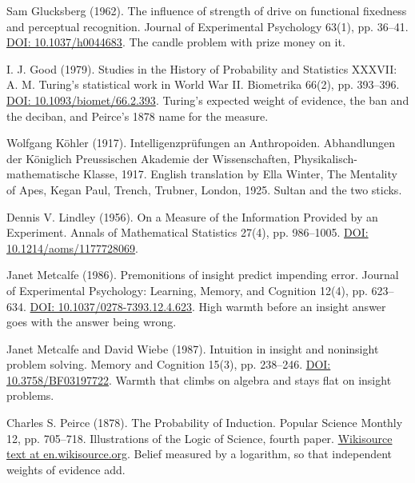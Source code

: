 \documentclass[11pt,twoside]{article}
\theoremstyle{thielethm}
\theoremstyle{thieledef}
\theoremstyle{thieledef}
\theoremstyle{thieledef}
\theoremstyle{thielethm}
\theoremstyle{thieleobs}
\theoremstyle{thielethm}
\begin{document}
\noindent Sam Glucksberg (1962). The influence of strength of drive on functional fixedness and perceptual recognition. Journal of Experimental Psychology 63(1), pp. 36--41. \href{https://doi.org/10.1037/h0044683}{DOI: 10.1037/h0044683}. The candle problem with prize money on it.
\par\medskip

\noindent I. J. Good (1979). Studies in the History of Probability and Statistics XXXVII: A. M. Turing's statistical work in World War II. Biometrika 66(2), pp. 393--396. \href{https://doi.org/10.1093/biomet/66.2.393}{DOI: 10.1093/biomet/66.2.393}. Turing's expected weight of evidence, the ban and the deciban, and Peirce's 1878 name for the measure.
\par\medskip

\noindent Wolfgang K\"ohler (1917). Intelligenzpr\"ufungen an Anthropoiden. Abhandlungen der K\"oniglich Preussischen Akademie der Wissenschaften, Physikalisch-mathematische Klasse, 1917. English translation by Ella Winter, The Mentality of Apes, Kegan Paul, Trench, Trubner, London, 1925. Sultan and the two sticks.
\par\medskip

\noindent Dennis V. Lindley (1956). On a Measure of the Information Provided by an Experiment. Annals of Mathematical Statistics 27(4), pp. 986--1005. \href{https://doi.org/10.1214/aoms/1177728069}{DOI: 10.1214/aoms/1177728069}.
\par\medskip

\noindent Janet Metcalfe (1986). Premonitions of insight predict impending error. Journal of Experimental Psychology: Learning, Memory, and Cognition 12(4), pp. 623--634. \href{https://doi.org/10.1037/0278-7393.12.4.623}{DOI: 10.1037/0278-7393.12.4.623}. High warmth before an insight answer goes with the answer being wrong.
\par\medskip

\noindent Janet Metcalfe and David Wiebe (1987). Intuition in insight and noninsight problem solving. Memory and Cognition 15(3), pp. 238--246. \href{https://doi.org/10.3758/BF03197722}{DOI: 10.3758/BF03197722}. Warmth that climbs on algebra and stays flat on insight problems.
\par\medskip

\noindent Charles S. Peirce (1878). The Probability of Induction. Popular Science Monthly 12, pp. 705--718. Illustrations of the Logic of Science, fourth paper. \href{https://en.wikisource.org/wiki/Popular_Science_Monthly/Volume_12/April_1878/Illustrations_of_the_Logic_of_Science_IV}{Wikisource text at en.wikisource.org}. Belief measured by a logarithm, so that independent weights of evidence add.
\par\medskip
\end{document}
